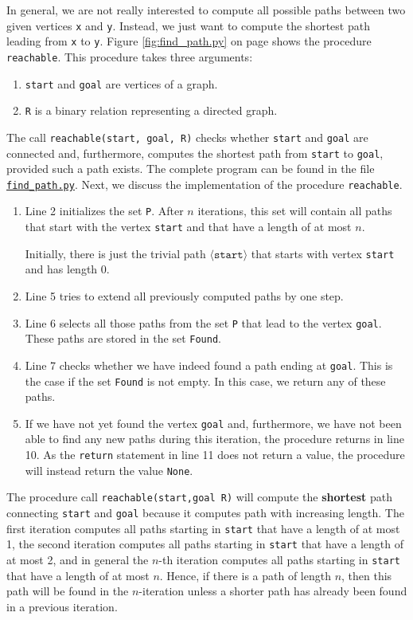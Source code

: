 In general, we are not really interested to compute all possible paths between two given vertices
\texttt{x} and \texttt{y}.  Instead, we just want to compute the shortest path leading from \texttt{x} to \texttt{y}.
Figure \ref{fig:find_path.py} on page \pageref{fig:find_path.py} shows the procedure \texttt{reachable}. 
This procedure takes three arguments:
\begin{enumerate}
\item \texttt{start} and \texttt{goal} are vertices of a graph.
\item \texttt{R} is a binary relation representing a directed graph.
\end{enumerate}
The call  \texttt{reachable(start, goal, R)} checks whether \texttt{start} and \texttt{goal} are connected and, furthermore,
computes the shortest path from \texttt{start} to \texttt{goal}, provided such a path exists.
The complete program can be found in the file
\href{https://github.com/karlstroetmann/Logic/blob/master/Python/find\_path.py}{\texttt{find\_path.py}}.
Next, we discuss the implementation of the procedure  \texttt{reachable}.
\begin{enumerate}
\item Line 2 initializes the set \texttt{P}.  After $n$ iterations, this set will contain all paths
      that start with the vertex \texttt{start} and that have a length of at most $n$.

      Initially, there is just the trivial path $\langle\texttt{start}\rangle$ that starts with vertex
      \texttt{start} and has length $0$.
\item Line 5 tries to extend all previously computed paths by one step.
\item Line 6 selects all those paths from the set \texttt{P} that lead to the vertex \texttt{goal}.
      These paths are stored in the set \texttt{Found}.
\item Line 7 checks whether we have indeed found a path ending at \texttt{goal}.  This is the case if
      the set \texttt{Found} is not empty.  
      In this case, we return any of these paths.
\item If we have not yet found the vertex \texttt{goal} and, furthermore, we have not been able to find
      any new paths during this iteration,  the procedure returns in line 10.
      As the \texttt{return} statement in line 11 does not return a value, the procedure will
      instead return the value \texttt{None}.
\end{enumerate}
The procedure call \texttt{reachable(start,goal R)} will compute the \textbf{shortest} path connecting
\texttt{start} and \texttt{goal} because it computes path with increasing length.  The first iteration
computes all paths starting in \texttt{start} that have a length of at most 1, the second iteration
computes all paths starting in \texttt{start} that have a length of at most 2, and in general the $n$-th
iteration computes all paths starting in \texttt{start} that have a length of at most $n$.  Hence, if
there is a path of length $n$, then this path will be found in the $n$-iteration unless a shorter path has
already been found in a previous iteration.  

